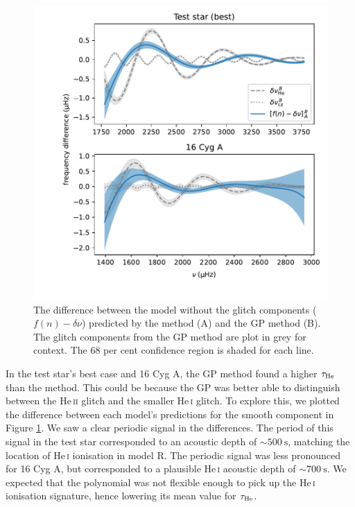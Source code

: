 \begin{figure}[!tb]
    \centering
    \includegraphics[trim={0.4in 0.2in 0 0},clip]{figures/glitch-res.pdf}
    \caption[The difference between the model without the glitch components predicted by theV19 method and the GP method.]{The difference between the model without the glitch components (\(f(n) - \delta\nu\)) predicted by the  method (A) and the GP method (B). The glitch components from the GP method are plot in grey for context. The 68 per cent confidence region is shaded for each line.}
    \label{fig:smooth-res}
\end{figure}

In the test star's best case and 16 Cyg A, the GP method found a higher \(\tau_{{\mathrm{He}}}\) than the  method. This could be because the GP was better able to distinguish between the He\,\textsc{ii} glitch and the smaller He\,\textsc{i} glitch. To explore this, we plotted the difference between each model's predictions for the smooth component in Figure \ref{fig:smooth-res}. We saw a clear periodic signal in the differences. The period of this signal in the test star corresponded to an acoustic depth of \(\sim \SI{500}{\second}\), matching the location of He\,\textsc{i} ionisation in model R. The periodic signal was less pronounced for 16 Cyg A, but corresponded to a plausible He\,\textsc{i} acoustic depth of \(\sim \SI{700}{\second}\). We expected that the polynomial was not flexible enough to pick up the He\,\textsc{i} ionisation signature, hence lowering its mean value for \(\tau_{{\mathrm{He}}}\).

